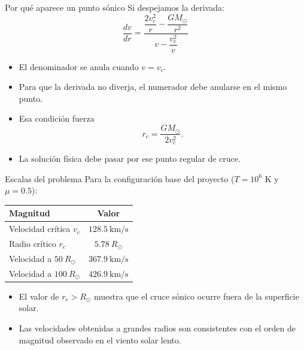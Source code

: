 \documentclass[aspectratio=169]{beamer}
\begin{document}
\begin{frame}{Por qu\'e aparece un punto s\'onico}
  Si despejamos la derivada:
  \[
    \frac{dv}{dr}
    =
    \frac{\dfrac{2v_c^2}{r}-\dfrac{GM_\odot}{r^2}}
         {v-\dfrac{v_c^2}{v}}
  \]

  \begin{itemize}
    \item El denominador se anula cuando $v = v_c$.
    \item Para que la derivada no diverja, el numerador debe anularse en el mismo punto.
    \item Esa condici\'on fuerza
    \[
      r_c = \frac{GM_\odot}{2v_c^2}.
    \]
    \item La soluci\'on f\'isica debe pasar por ese punto regular de cruce.
  \end{itemize}
\end{frame}

\begin{frame}{Escalas del problema}
  Para la configuraci\'on base del proyecto ($T = 10^6$ K y $\mu = 0.5$):

  \begin{table}
    \centering
    \begin{tabular}{lc}
      \toprule
      Magnitud & Valor \\
      \midrule
      Velocidad cr\'itica $v_c$ & $128.5\ \mathrm{km/s}$ \\
      Radio cr\'itico $r_c$ & $5.78\ R_\odot$ \\
      Velocidad a $50\ R_\odot$ & $367.9\ \mathrm{km/s}$ \\
      Velocidad a $100\ R_\odot$ & $426.9\ \mathrm{km/s}$ \\
      \bottomrule
    \end{tabular}
  \end{table}
  \begin{itemize}
    \item El valor de $r_c > R_\odot$ muestra que el cruce s\'onico ocurre fuera de la superficie solar.
    \item Las velocidades obtenidas a grandes radios son consistentes con el orden de magnitud observado en el viento solar lento.
  \end{itemize}
\end{frame}
\end{document}
